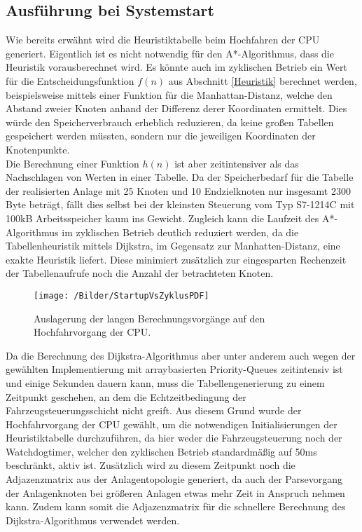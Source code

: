 	
		\subsection{Ausführung bei Systemstart}
			
			Wie bereits erwähnt wird die Heuristiktabelle beim Hochfahren der CPU generiert. Eigentlich ist es nicht notwendig für den A*-Algorithmus, dass die Heuristik vorausberechnet wird. Es könnte auch im zyklischen Betrieb ein Wert für die Entscheidungsfunktion $f(n)$ aus Abschnitt \ref{Heuristik} berechnet werden, beispielsweise mittels einer Funktion für die Manhattan-Distanz, welche den Abstand zweier Knoten anhand der Differenz derer Koordinaten ermittelt. Dies würde den Speicherverbrauch erheblich reduzieren, da keine großen Tabellen gespeichert werden müssten, sondern nur die jeweiligen Koordinaten der Knotenpunkte.
			\\[4pt]
			Die Berechnung einer Funktion $h(n)$ ist aber zeitintensiver als das Nachschlagen von Werten in einer Tabelle. Da der Speicherbedarf für die Tabelle der realisierten Anlage mit 25 Knoten und 10 Endzielknoten nur insgesamt 2300 Byte beträgt, fällt dies selbst bei der kleinsten Steuerung vom Typ S7-1214C mit 100kB Arbeitsspeicher kaum ins Gewicht. Zugleich kann die Laufzeit des A*-Algorithmus im zyklischen Betrieb deutlich reduziert werden, da die Tabellenheuristik mittels Dijkstra, im Gegensatz zur Manhatten-Distanz, eine exakte Heuristik liefert. Diese minimiert zusätzlich zur eingesparten Rechenzeit der Tabellenaufrufe noch die Anzahl der betrachteten Knoten.
			
			\begin{figure}
				\centering
				\texttt{[image: /Bilder/StartupVsZyklusPDF]}
				\vspace{0.2cm}
				\caption{Auslagerung der langen Berechnungsvorgänge auf den Hochfahrvorgang der CPU.}
			\end{figure}
			
			Da die Berechnung des Dijkstra-Algorithmus aber unter anderem auch wegen der gewählten Implementierung mit arraybasierten Priority-Queues zeitintensiv ist \cite{BorisCherkassky1993} und einige Sekunden dauern kann, muss die Tabellengenerierung zu einem Zeitpunkt geschehen, an dem die Echtzeitbedingung der Fahrzeugsteuerungsschicht nicht greift. Aus diesem Grund wurde der Hochfahrvorgang der CPU gewählt, um die notwendigen Initialisierungen der Heuristiktabelle durchzuführen, da hier weder die Fahrzeugsteuerung noch der Watchdogtimer, welcher den zyklischen Betrieb standardmäßig auf 50ms beschränkt, aktiv ist. Zusätzlich wird zu diesem Zeitpunkt noch die Adjazenzmatrix aus der Anlagentopologie generiert, da auch der Parsevorgang der Anlagenknoten bei größeren Anlagen etwas mehr Zeit in Anspruch nehmen kann. Zudem kann somit die Adjazenzmatrix für die schnellere Berechnung des Dijkstra-Algorithmus verwendet werden.
				

